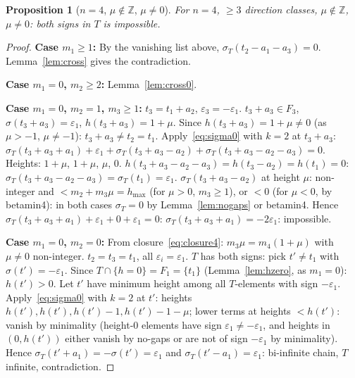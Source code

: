 \documentclass{article}
\newtheorem{prop}{Proposition}
\begin{document}
\begin{prop}[$n=4$, $\mu\notin\mathbb{Z}$, $\mu\ne 0$]\label{prop:n4mu}
For $n=4$, $\ge 3$ direction classes, $\mu\notin\mathbb{Z}$, $\mu\ne 0$:
both signs in $T$ is impossible.
\end{prop}
\begin{proof}
\textbf{Case $m_1\ge 1$:}
By the vanishing list above, $\sigma_T(t_2-a_1-a_3)=0$.
Lemma~\ref{lem:cross} gives the contradiction.

\textbf{Case $m_1=0$, $m_2\ge 2$:}
Lemma~\ref{lem:cross0}.

\textbf{Case $m_1=0$, $m_2=1$, $m_3\ge 1$:}
$t_3=t_1+a_2$, $\varepsilon_3=-\varepsilon_1$.
$t_3+a_3\in F_3$, $\sigma(t_3+a_3)=\varepsilon_1$, $h(t_3+a_3)=1+\mu$.
Since $h(t_3+a_3)=1+\mu\ne 0$ (as $\mu>-1$, $\mu\ne-1$): $t_3+a_3\ne t_2=t_1$.
Apply~\eqref{eq:sigma0} with $k=2$ at $t_3+a_3$:
$\sigma_T(t_3+a_3+a_1)+\varepsilon_1+\sigma_T(t_3+a_3-a_2)+\sigma_T(t_3+a_3-a_2-a_3)=0$.
Heights: $1+\mu$, $1+\mu$, $\mu$, $0$.
$h(t_3+a_3-a_2-a_3)=h(t_3-a_2)=h(t_1)=0$: $\sigma_T(t_3+a_3-a_2-a_3)=\sigma_T(t_1)=\varepsilon_1$.
$\sigma_T(t_3+a_3-a_2)$ at height $\mu$: non-integer and $<m_2+m_3\mu=h_{\max}$ (for $\mu>0$, $m_3\ge 1$),
or $<0$ (for $\mu<0$, by betamin4): in both cases $\sigma_T=0$ by Lemma~\ref{lem:nogaps} or betamin4.
Hence $\sigma_T(t_3+a_3+a_1)+\varepsilon_1+0+\varepsilon_1=0$:
$\sigma_T(t_3+a_3+a_1)=-2\varepsilon_1$: impossible.

\textbf{Case $m_1=0$, $m_2=0$:}
From closure~\eqref{eq:closure4}: $m_3\mu=m_4(1+\mu)$ with $\mu\ne 0$ non-integer.
$t_2=t_3=t_1$, all $\varepsilon_i=\varepsilon_1$.  $T$ has both signs: pick $t'\ne t_1$ with $\sigma(t')=-\varepsilon_1$.
Since $T\cap\{h=0\}=F_1=\{t_1\}$ (Lemma~\ref{lem:hzero}, as $m_1=0$): $h(t')>0$.
Let $t'$ have minimum height among all $T$-elements with sign $-\varepsilon_1$.
Apply~\eqref{eq:sigma0} with $k=2$ at $t'$: heights $h(t'),h(t'),h(t')-1,h(t')-1-\mu$;
lower terms at heights $<h(t')$: vanish by minimality (height-$0$ elements have sign $\varepsilon_1\ne-\varepsilon_1$, and heights in $(0,h(t'))$ either vanish by no-gaps or are not of sign $-\varepsilon_1$ by minimality).
Hence $\sigma_T(t'+a_1)=-\sigma(t')=\varepsilon_1$ and $\sigma_T(t'-a_1)=\varepsilon_1$: bi-infinite chain, $T$ infinite, contradiction.
\end{proof}
\end{document}
